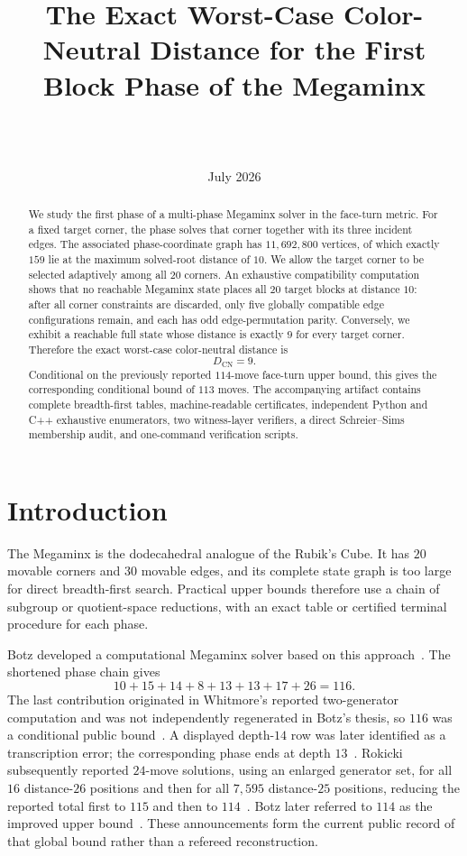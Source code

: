 \documentclass[11pt]{article}
\title{The Exact Worst-Case Color-Neutral Distance for the First Block Phase of the Megaminx}
\author{\PaperAuthor\\\small \PaperAffiliation\\\small \texttt{\PaperEmail}}
\date{July 2026}
\theoremstyle{definition}
\newcommand{\DCN}{D_{\mathrm{CN}}}
\begin{document}
\maketitle

\begin{abstract}
We study the first phase of a multi-phase Megaminx solver in the face-turn metric.  For a fixed target corner, the phase solves that corner together with its three incident edges.  The associated phase-coordinate graph has $11{,}692{,}800$ vertices, of which exactly $159$ lie at the maximum solved-root distance of $10$.  We allow the target corner to be selected adaptively among all $20$ corners.  An exhaustive compatibility computation shows that no reachable Megaminx state places all $20$ target blocks at distance $10$: after all corner constraints are discarded, only five globally compatible edge configurations remain, and each has odd edge-permutation parity.  Conversely, we exhibit a reachable full state whose distance is exactly $9$ for every target corner.  Therefore the exact worst-case color-neutral distance is
\[
\DCN=9.
\]
Conditional on the previously reported $114$-move face-turn upper bound, this gives the corresponding conditional bound of $113$ moves.  The accompanying artifact contains complete breadth-first tables, machine-readable certificates, independent Python and C++ exhaustive enumerators, two witness-layer verifiers, a direct Schreier--Sims membership audit, and one-command verification scripts.
\end{abstract}

\section{Introduction}

The Megaminx is the dodecahedral analogue of the Rubik's Cube.  It has $20$ movable corners and $30$ movable edges, and its complete state graph is too large for direct breadth-first search.  Practical upper bounds therefore use a chain of subgroup or quotient-space reductions, with an exact table or certified terminal procedure for each phase.

Botz developed a computational Megaminx solver based on this approach~\cite{botz-software,botz-thread}.  The shortened phase chain gives
\[
10+15+14+8+13+13+17+26=116.
\]
The last contribution originated in Whitmore's reported two-generator computation and was not independently regenerated in Botz's thesis, so $116$ was a conditional public bound~\cite{botz-software,botz-116}.  A displayed depth-$14$ row was later identified as a transcription error; the corresponding phase ends at depth $13$~\cite{botz-116-correction}.  Rokicki subsequently reported $24$-move solutions, using an enlarged generator set, for all $16$ distance-$26$ positions and then for all $7{,}595$ distance-$25$ positions, reducing the reported total first to $115$ and then to $114$~\cite{rokicki-115,rokicki-114}.  Botz later referred to $114$ as the improved upper bound~\cite{botz-114}.  These announcements form the current public record of that global bound rather than a refereed reconstruction.
\end{document}
